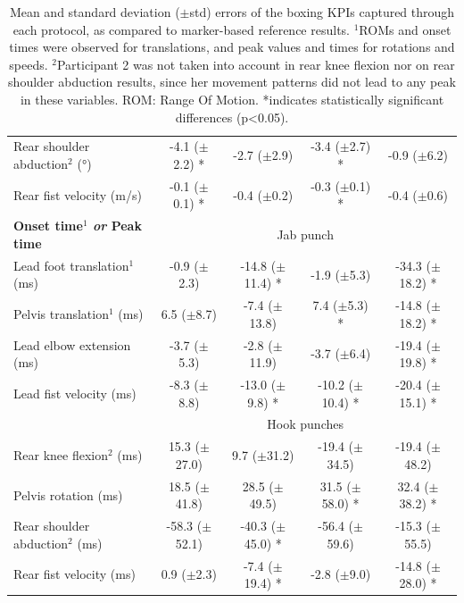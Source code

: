 \begin{table}[!ht]
{\begin{tabular}{lcccc}
          Rear shoulder abduction\(^2\) (°) & -4.1 ($\pm$2.2) * & -2.7 ($\pm$2.9) & -3.4 ($\pm$2.7) * & -0.9 ($\pm$6.2) \\
          Rear fist velocity (m/s) & -0.1 ($\pm$0.1) * & -0.4 ($\pm$0.2) & -0.3 ($\pm$0.1) * & -0.4 ($\pm$0.6) \\
          \midrule
          \textbf{Onset time\(^1\) \emph{or} Peak time} & \multicolumn{4}{c}{Jab punch} \\
          \cmidrule(l{2pt}r{2pt}){2-5}
          Lead foot translation\(^1\) (ms) & -0.9 ($\pm$2.3) & -14.8 ($\pm$11.4) * & -1.9 ($\pm$5.3) & -34.3 ($\pm$18.2) * \\
          Pelvis translation\(^1\) (ms) & 6.5 ($\pm$8.7) & -7.4 ($\pm$13.8) & 7.4 ($\pm$5.3) * & -14.8 ($\pm$18.2) * \\
          Lead elbow extension (ms) & -3.7 ($\pm$5.3) & -2.8 ($\pm$11.9) & -3.7 ($\pm$6.4) & -19.4 ($\pm$19.8) * \\
          Lead fist velocity (ms)& -8.3 ($\pm$8.8) & -13.0 ($\pm$9.8) * & -10.2 ($\pm$10.4) * & -20.4 ($\pm$15.1) * \\
          \cmidrule(l{2pt}r{2pt}){2-5}
          ~ & \multicolumn{4}{c}{Hook punches} \\
          \cmidrule(l{2pt}r{2pt}){2-5}
          Rear knee flexion\(^2\) (ms) & 15.3 ($\pm$27.0) & 9.7 ($\pm$31.2) & -19.4 ($\pm$34.5) & -19.4 ($\pm$48.2) \\
          Pelvis rotation (ms) & 18.5 ($\pm$41.8) & 28.5 ($\pm$49.5) & 31.5 ($\pm$58.0) * & 32.4 ($\pm$38.2) * \\
          Rear shoulder abduction\(^2\) (ms) & -58.3 ($\pm$52.1) & -40.3 ($\pm$45.0) * & -56.4 ($\pm$59.6) & -15.3 ($\pm$55.5) \\
          Rear fist velocity (ms) & 0.9 ($\pm$2.3) & -7.4 ($\pm$19.4) * & -2.8 ($\pm$9.0) & -14.8 ($\pm$28.0) * \\
          \bottomrule
      \end{tabular}}
      \caption{Mean and standard deviation ($\pm$std) errors of the boxing KPIs captured through each protocol, as compared to marker-based reference results. \(^1\)ROMs and onset times were observed for translations, and peak values and times for rotations and speeds. \(^2\)Participant 2 was not taken into account in rear knee flexion nor on rear shoulder abduction results, since her movement patterns did not lead to any peak in these variables.  ROM: Range Of Motion. *indicates statistically significant differences (p<0.05).}
      \label{table:tab_peakboxe}
\end{table}


